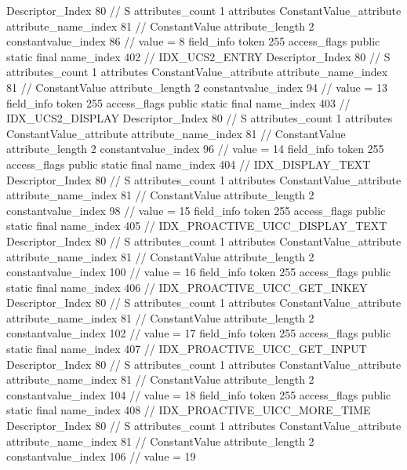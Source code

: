 {{{{{				Descriptor_Index	80		// S
				attributes_count	1
				attributes {
				ConstantValue_attribute {
					attribute_name_index	81		// ConstantValue
					attribute_length	2
					constantvalue_index	86		// value = 8
				}
				}
			}
			field_info {
				token	255
				access_flags	public static final
				name_index	402		// IDX_UCS2_ENTRY
				Descriptor_Index	80		// S
				attributes_count	1
				attributes {
				ConstantValue_attribute {
					attribute_name_index	81		// ConstantValue
					attribute_length	2
					constantvalue_index	94		// value = 13
				}
				}
			}
			field_info {
				token	255
				access_flags	public static final
				name_index	403		// IDX_UCS2_DISPLAY
				Descriptor_Index	80		// S
				attributes_count	1
				attributes {
				ConstantValue_attribute {
					attribute_name_index	81		// ConstantValue
					attribute_length	2
					constantvalue_index	96		// value = 14
				}
				}
			}
			field_info {
				token	255
				access_flags	public static final
				name_index	404		// IDX_DISPLAY_TEXT
				Descriptor_Index	80		// S
				attributes_count	1
				attributes {
				ConstantValue_attribute {
					attribute_name_index	81		// ConstantValue
					attribute_length	2
					constantvalue_index	98		// value = 15
				}
				}
			}
			field_info {
				token	255
				access_flags	public static final
				name_index	405		// IDX_PROACTIVE_UICC_DISPLAY_TEXT
				Descriptor_Index	80		// S
				attributes_count	1
				attributes {
				ConstantValue_attribute {
					attribute_name_index	81		// ConstantValue
					attribute_length	2
					constantvalue_index	100		// value = 16
				}
				}
			}
			field_info {
				token	255
				access_flags	public static final
				name_index	406		// IDX_PROACTIVE_UICC_GET_INKEY
				Descriptor_Index	80		// S
				attributes_count	1
				attributes {
				ConstantValue_attribute {
					attribute_name_index	81		// ConstantValue
					attribute_length	2
					constantvalue_index	102		// value = 17
				}
				}
			}
			field_info {
				token	255
				access_flags	public static final
				name_index	407		// IDX_PROACTIVE_UICC_GET_INPUT
				Descriptor_Index	80		// S
				attributes_count	1
				attributes {
				ConstantValue_attribute {
					attribute_name_index	81		// ConstantValue
					attribute_length	2
					constantvalue_index	104		// value = 18
				}
				}
			}
			field_info {
				token	255
				access_flags	public static final
				name_index	408		// IDX_PROACTIVE_UICC_MORE_TIME
				Descriptor_Index	80		// S
				attributes_count	1
				attributes {
				ConstantValue_attribute {
					attribute_name_index	81		// ConstantValue
					attribute_length	2
					constantvalue_index	106		// value = 19
}}}}}}}
